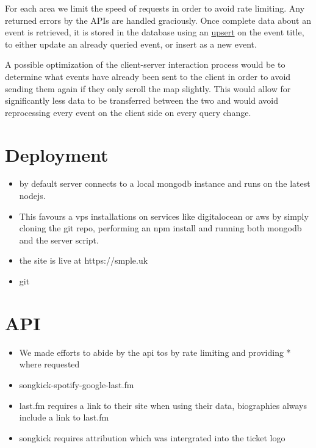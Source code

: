 \documentclass[10pt]{article}
\begin{document}
        For each area we limit the speed of requests in order to avoid rate limiting. Any returned errors by the APIs are handled graciously. Once complete data about an event is retrieved, it is stored in the database using an \href{https://docs.mongodb.com/manual/reference/method/db.collection.update/#upsert-option}{upsert} on the event title, to either update an already queried event, or insert as a new event.

        A possible optimization of the client-server interaction process would be to determine what events have already been sent to the client in order to avoid sending them again if they only scroll the map slightly. This would allow for significantly less data to be transferred between the two and would avoid reprocessing every event on the client side on every query change.


    \section{Deployment}
        \begin{itemize}
            \item by default server connects to a local mongodb instance and runs on the latest nodejs.
            \item This favours a vps installations on services like digitalocean or aws by simply cloning the git repo, performing an npm install and running both mongodb and the server script.
            \item the site is live at https://smple.uk
            \item git
        \end{itemize}

    \section{API}
        \begin{itemize}
            \item We made efforts to abide by the api tos by rate limiting and providing * where requested
            \item songkick-spotify-google-last.fm
            \item last.fm requires a link to their site when using their data, biographies always include  a link to last.fm
            \item songkick requires attribution which was intergrated into the ticket logo
        \end{itemize}
\end{document}
